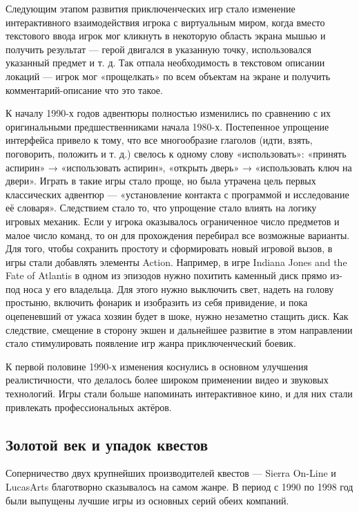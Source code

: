 Следующим этапом развития приключенческих игр стало изменение интерактивного взаимодействия игрока с виртуальным миром, когда вместо текстового ввода игрок мог кликнуть в некоторую область экрана мышью и получить результат — герой двигался в указанную точку, использовался указанный предмет и т. д. Так отпала необходимость в текстовом описании локаций — игрок мог «прощелкать» по всем объектам на экране и получить комментарий-описание что это такое.

К началу 1990-х годов адвентюры полностью изменились по сравнению с их оригинальными предшественниками начала 1980-х. Постепенное упрощение интерфейса привело к тому, что все многообразие глаголов (идти, взять, поговорить, положить и т. д.) свелось к одному слову «использовать»: «принять аспирин» → «использовать аспирин», «открыть дверь» → «использовать ключ на двери». Играть в такие игры стало проще, но была утрачена цель первых классических адвентюр — «установление контакта с программой и исследование её словаря». Следствием стало то, что упрощение стало влиять на логику игровых механик. Если у игрока оказывалось ограниченное число предметов и малое число команд, то он для прохождения перебирал все возможные варианты. Для того, чтобы сохранить простоту и сформировать новый игровой вызов, в игры стали добавлять элементы Action. Например, в игре Indiana Jones and the Fate of Atlantis в одном из эпизодов нужно похитить каменный диск прямо из-под носа у его владельца. Для этого нужно выключить свет, надеть на голову простыню, включить фонарик и изобразить из себя привидение, и пока оцепеневший от ужаса хозяин будет в шоке, нужно незаметно стащить диск. Как следствие, смещение в сторону экшен и дальнейшее развитие в этом направлении стало стимулировать появление игр жанра приключенческий боевик.

К первой половине 1990-х изменения коснулись в основном улучшения реалистичности, что делалось более широком применении видео и звуковых технологий. Игры стали больше напоминать интерактивное кино, и для них стали привлекать профессиональных актёров.

\subsection{Золотой век и упадок квестов}

Соперничество двух крупнейших производителей квестов — Sierra On-Line и LucasArts благотворно сказывалось на самом жанре. В период с 1990 по 1998 год были выпущены лучшие игры из основных серий обеих компаний.

